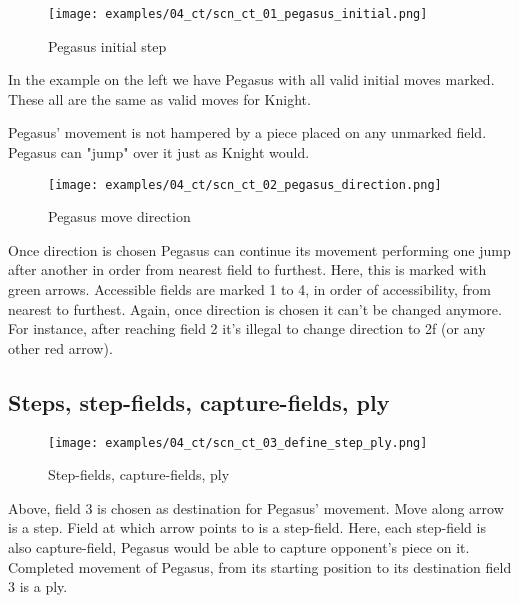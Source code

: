 \noindent
\begin{wrapfigure}[15]{l}{0.5\textwidth}
\centering
\texttt{[image: examples/04\_ct/scn\_ct\_01\_pegasus\_initial.png]}
\caption{Pegasus initial step}
\label{fig:scn_ct_01_pegasus_initial}
\end{wrapfigure}
In the example on the left we have Pegasus with all valid initial moves marked.
These all are the same as valid moves for Knight.

Pegasus' movement is not hampered by a piece placed on any unmarked field.
Pegasus can "jump" over it just as Knight would.

\clearpage %

\noindent
\begin{figure}[!h]
\texttt{[image: examples/04\_ct/scn\_ct\_02\_pegasus\_direction.png]}
\caption{Pegasus move direction}
\label{fig:scn_ct_02_pegasus_direction}
\end{figure}

Once direction is chosen Pegasus can continue its movement performing one jump
after another in order from nearest field to furthest. Here, this is marked
with green arrows. Accessible fields are marked 1 to 4, in order of accessibility,
from nearest to furthest. Again, once direction is chosen it can't be changed anymore.
For instance, after reaching field 2 it's illegal to change direction to 2f (or
any other red arrow).

\clearpage %

\subsection*{Steps, step-fields, capture-fields, ply}
\label{sec:Croatian Ties/Pegasus/Steps, step-fields, capture-fields, ply}

\noindent
\begin{figure}[!h]
\vspace{-1.0\baselineskip}
\texttt{[image: examples/04\_ct/scn\_ct\_03\_define\_step\_ply.png]}
\caption{Step-fields, capture-fields, ply}
\label{fig:scn_ct_03_define_step_ply}
\end{figure}

Above, field 3 is chosen as destination for Pegasus' movement. Move along arrow is a step.
Field at which arrow points to is a step-field. Here, each step-field is also capture-field,
Pegasus would be able to capture opponent's piece on it. Completed movement of Pegasus,
from its starting position to its destination field 3 is a ply.

